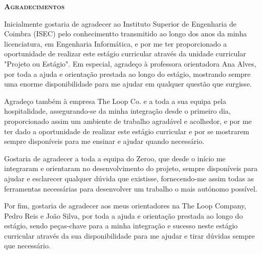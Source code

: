 
\vspace*{45pt}
\begin{flushleft}
	{\Large \textbf{\scshape{Agradecimentos}}}
\end{flushleft}
\vspace*{10pt}


Inicialmente gostaria de agradecer ao Instituto Superior de Engenharia de Coimbra (ISEC) pelo conhecimentto transmitido ao longo dos anos da minha licenciatura,
em Engenharia Informática, e por me ter proporcionado a oportunidade de realizar este estágio curricular através da unidade curricular "Projeto ou Estágio". Em especial, agradeço
à professora orientadora Ana Alves, por toda a ajuda e orientação prestada ao longo do estágio, mostrando sempre uma enorme disponibilidade para me ajudar em qualquer questão que surgisse.

Agradeço também à empresa The Loop Co. e a toda a sua equipa pela hospitalidade, assegurando-se da minha integração desde o primeiro dia, proporcionado assim um ambiente de trabalho agradável e acolhedor, e por me ter dado a oportunidade de
realizar este estágio curricular e por se mostrarem sempre disponíveis para me ensinar e ajudar quando necessário.

Gostaria de agradecer a toda a equipa do Zeroo, que desde o início me integraram e orientaram no desenvolvimento do projeto, sempre disponíveis para ajudar e esclarecer qualquer dúvida que existisse, fornecendo-me assim todas as ferramentas necessárias para desenvolver um trabalho o mais autónomo possível. 

Por fim, gostaria de agradecer aos meus orientadores na The Loop Company, Pedro Reis e João Silva, por toda a ajuda e orientação prestada ao longo do estágio, sendo peças-chave para a minha integração e sucesso neste estágio curricular através da sua disponibilidade para me ajudar e tirar dúvidas sempre que necessário.

